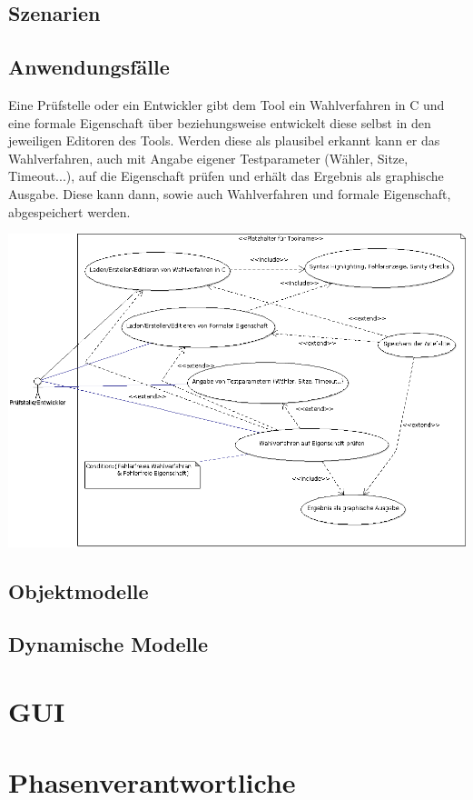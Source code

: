 \documentclass[a4paper]{scrreprt}
\begin{document}
\section{Szenarien}
\section{Anwendungsfälle}
Eine Prüfstelle oder ein Entwickler gibt dem Tool ein Wahlverfahren in C und eine formale 
Eigenschaft über beziehungsweise entwickelt diese selbst in den jeweiligen Editoren des Tools. 
Werden diese als plausibel erkannt kann er das Wahlverfahren, auch mit Angabe eigener 
Testparameter (Wähler, Sitze, Timeout...), auf die Eigenschaft prüfen und erhält das Ergebnis 
als graphische Ausgabe. 
Diese kann dann, sowie auch Wahlverfahren und formale Eigenschaft, abgespeichert werden.


{\vspace{0.5cm}\hspace*{-3cm}\includegraphics[scale=0.49]{Use-Case-Diagram}}
	
 
\section{Objektmodelle}
\section{Dynamische Modelle}


\chapter{GUI}


\chapter{Phasenverantwortliche}
\end{document}
